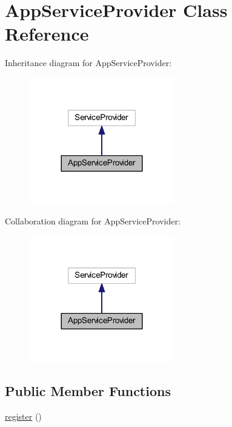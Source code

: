 \hypertarget{class_app_1_1_providers_1_1_app_service_provider}{}\section{App\+Service\+Provider Class Reference}
\label{class_app_1_1_providers_1_1_app_service_provider}


Inheritance diagram for App\+Service\+Provider\+:
\nopagebreak
\begin{figure}[H]
\begin{center}
\leavevmode
\includegraphics[width=180pt]{class_app_1_1_providers_1_1_app_service_provider__inherit__graph}
\end{center}
\end{figure}


Collaboration diagram for App\+Service\+Provider\+:
\nopagebreak
\begin{figure}[H]
\begin{center}
\leavevmode
\includegraphics[width=180pt]{class_app_1_1_providers_1_1_app_service_provider__coll__graph}
\end{center}
\end{figure}
\subsection*{Public Member Functions}
\begin{DoxyCompactItemize}
\item 
\mbox{\hyperlink{class_app_1_1_providers_1_1_app_service_provider_acc294a6cc8e69743746820e3d15e3f78}{register}} ()
\end{DoxyCompactItemize}



